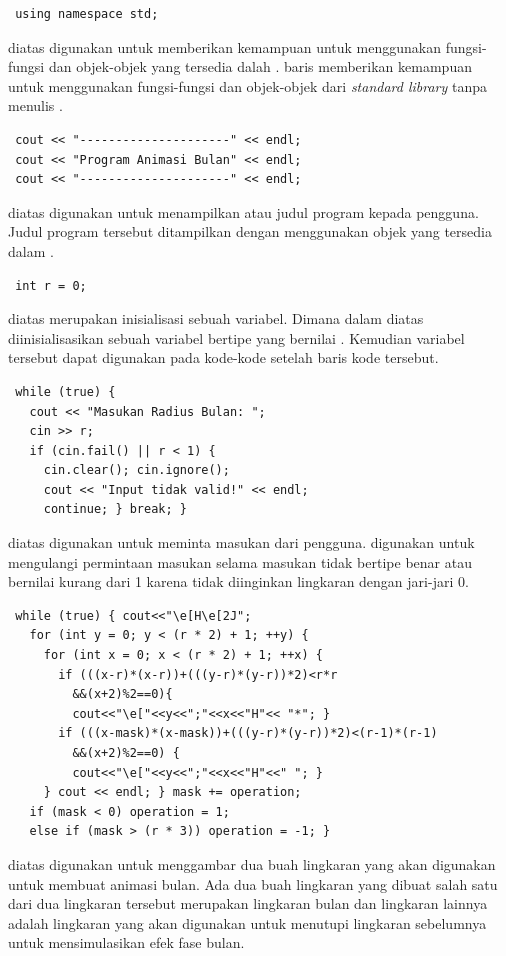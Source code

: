 \documentclass[../main.tex]{subfiles}
\begin{document}
\begin{lstlisting}
 using namespace std;
\end{lstlisting}
    \ilz{}{\Script} diatas digunakan untuk memberikan kemampuan untuk menggunakan fungsi-fungsi dan objek-objek yang tersedia dalah {\header} {\file} . {\Script} baris  memberikan kemampuan untuk menggunakan fungsi-fungsi dan objek-objek dari \textit{standard library} tanpa menulis .

\begin{lstlisting}
 cout << "---------------------" << endl;
 cout << "Program Animasi Bulan" << endl;
 cout << "---------------------" << endl;
\end{lstlisting}
    \ilz{}{\Script} diatas digunakan untuk menampilkan {\header} atau judul program kepada pengguna. Judul program tersebut ditampilkan dengan menggunakan objek  yang tersedia dalam {\header} {\file} .

\begin{lstlisting}
 int r = 0;
\end{lstlisting}
    \ilz{}{\Script} diatas merupakan {\statement} inisialisasi sebuah variabel. Dimana dalam {\script} diatas diinisialisasikan sebuah variabel  bertipe  yang bernilai . Kemudian variabel  tersebut dapat digunakan pada kode-kode setelah baris kode {\script} tersebut.

\begin{lstlisting}
 while (true) {
   cout << "Masukan Radius Bulan: ";
   cin >> r;
   if (cin.fail() || r < 1) {
     cin.clear(); cin.ignore();
     cout << "Input tidak valid!" << endl;
     continue; } break; }
\end{lstlisting}
    \ilz{}{\Script} diatas digunakan untuk meminta masukan dari pengguna. {\Statement}  digunakan untuk mengulangi permintaan masukan selama masukan tidak bertipe benar atau bernilai kurang dari 1 karena tidak diinginkan lingkaran dengan jari-jari 0.

\begin{lstlisting}
 while (true) { cout<<"\e[H\e[2J";
   for (int y = 0; y < (r * 2) + 1; ++y) {
     for (int x = 0; x < (r * 2) + 1; ++x) {
       if (((x-r)*(x-r))+(((y-r)*(y-r))*2)<r*r
         &&(x+2)%2==0){
         cout<<"\e["<<y<<";"<<x<<"H"<< "*"; }
       if (((x-mask)*(x-mask))+(((y-r)*(y-r))*2)<(r-1)*(r-1)
         &&(x+2)%2==0) {
         cout<<"\e["<<y<<";"<<x<<"H"<<" "; }
     } cout << endl; } mask += operation;
   if (mask < 0) operation = 1;
   else if (mask > (r * 3)) operation = -1; }
\end{lstlisting}
    \ilz{}{\Script} diatas digunakan untuk menggambar dua buah lingkaran yang akan digunakan untuk membuat animasi bulan. Ada dua buah lingkaran yang dibuat salah satu dari dua lingkaran tersebut merupakan lingkaran bulan dan lingkaran lainnya adalah lingkaran yang akan digunakan untuk menutupi lingkaran sebelumnya untuk mensimulasikan efek fase bulan.
\end{document}
